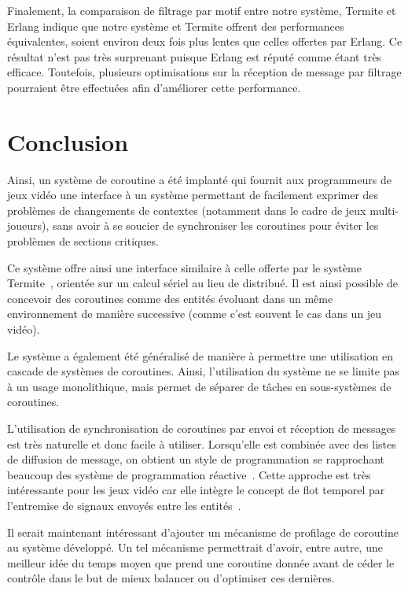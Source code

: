 \documentclass[12pt,oneside,letterpaper,francais]{book}
\begin{document}
Finalement, la comparaison de filtrage par motif entre notre système,
Termite et Erlang indique que notre système et Termite offrent des
performances équivalentes, soient environ deux fois plus lentes que
celles offertes par Erlang. Ce résultat n'est pas très surprenant
puisque Erlang est réputé comme étant très efficace. Toutefois,
plusieurs optimisations sur la réception de message par filtrage
pourraient être effectuées afin d'améliorer cette performance.

\section{Conclusion}

Ainsi, un système de coroutine a été implanté qui fournit aux
programmeurs de jeux vidéo une interface à un système permettant de
facilement exprimer des problèmes de changements de contextes
(notamment dans le cadre de jeux multi-joueurs), sans avoir à se
soucier de synchroniser les coroutines pour éviter les problèmes de
sections critiques.

Ce système offre ainsi une interface similaire à celle offerte par le
système Termite~\cite{Termite_paper}, orientée sur un calcul sériel au
lieu de distribué. Il est ainsi possible de concevoir des coroutines
comme des entités évoluant dans un même environnement de manière
successive (comme c'est souvent le cas dans un jeu vidéo).

Le système a également été généralisé de manière à permettre une
utilisation en cascade de systèmes de coroutines. Ainsi, l'utilisation
du système ne se limite pas à un usage monolithique, mais permet de
séparer de tâches en sous-systèmes de coroutines.

L'utilisation de synchronisation de coroutines par envoi et réception
de messages est très naturelle et donc facile à utiliser. Lorsqu'elle
est combinée avec des listes de diffusion de message, on obtient un
style de programmation se rapprochant beaucoup des système de
programmation réactive~\cite{FRP}. Cette approche est très
intéressante pour les jeux vidéo car elle intègre le concept de flot
temporel par l'entremise de signaux envoyés entre les
entités~\cite{yampa}.

Il serait maintenant intéressant d'ajouter un mécanisme de profilage
de coroutine au système développé. Un tel mécanisme permettrait
d'avoir, entre autre, une meilleur idée du temps moyen que prend une
coroutine donnée avant de céder le contrôle dans le but de mieux
balancer ou d'optimiser ces dernières.
\end{document}
